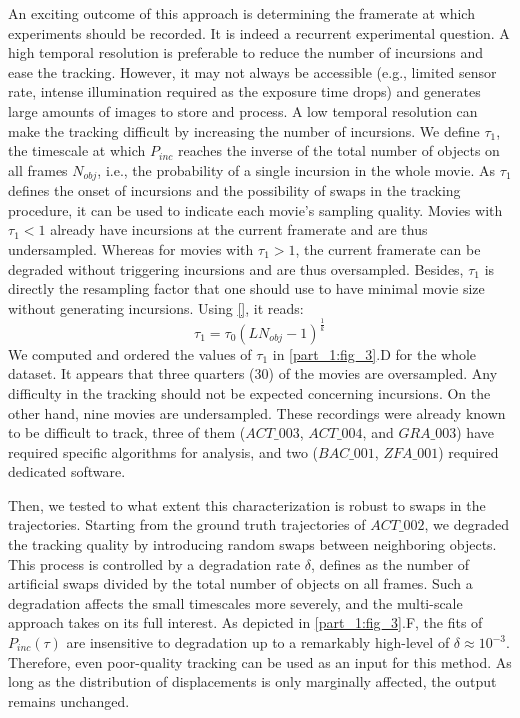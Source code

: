     An exciting outcome of this approach is determining the framerate at which experiments should be recorded. It is indeed a recurrent experimental question. A high temporal resolution is preferable to reduce the number of incursions and ease the tracking. However, it may not always be accessible (e.g., limited sensor rate, intense illumination required as the exposure time drops) and generates large amounts of images to store and process. A low temporal resolution can make the tracking difficult by increasing the number of incursions.
    We define $\tau_1$, the timescale at which $P_{inc}$ reaches the inverse of the total number of objects on all frames $N_{obj}$, i.e., the probability of a single incursion in the whole movie. As $\tau_1$ defines the onset of incursions and the possibility of swaps in the tracking procedure, it can be used to indicate each movie's sampling quality. Movies with $\tau_1<1$ already have incursions at the current framerate and are thus undersampled. Whereas for movies with $\tau_1>1$, the current framerate can be degraded without triggering incursions and are thus oversampled. Besides, $\tau_1$ is directly the resampling factor that one should use to have minimal movie size without generating incursions. Using \ref{}, it reads:
    $$\tau_1=\tau_0(LN_{obj}-1)^{\frac{1}{k}}$$
    We computed and ordered the values of $\tau_1$ in \ref{part_1:fig_3}.D for the whole dataset. It appears that three quarters (30) of the movies are oversampled. Any difficulty in the tracking should not be expected concerning incursions. On the other hand, nine movies are undersampled. These recordings were already known to be difficult to track, three of them ($ACT\_003$, $ACT\_004$, and $GRA\_003$) have required specific algorithms for analysis, and two ($BAC\_001$, $ZFA\_001$) required dedicated software.

    Then, we tested to what extent this characterization is robust to swaps in the trajectories. Starting from the ground truth trajectories of $ACT\_002$, we degraded the tracking quality by introducing random swaps between neighboring objects. This process is controlled by a degradation rate $\delta$, defines as the number of artificial swaps divided by the total number of objects on all frames. Such a degradation affects the small timescales more severely, and the multi-scale approach takes on its full interest. As depicted in \ref{part_1:fig_3}.F, the fits of $P_{inc}(\tau)$ are insensitive to degradation up to a remarkably high-level of $\delta \approx 10^{-3}$. Therefore, even poor-quality tracking can be used as an input for this method. As long as the distribution of displacements is only marginally affected, the output remains unchanged.

